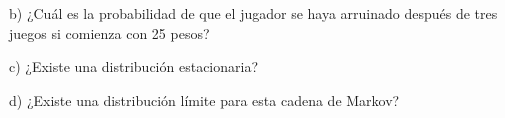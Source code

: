 \documentclass[a4paper, 12pt]{article}
\newcommand{\Aspace}{0.2cm}
\begin{document}
\begin{enumerate}
            \vspace{\Aspace} \par
            b) ¿Cuál es la probabilidad de que el jugador se haya arruinado después de tres juegos si comienza con 25 pesos?
            \\ { \color{azul}  }

            \vspace{\Aspace} \par
            c) ¿Existe una distribución estacionaria?
            \\ { \color{azul}  }

            \vspace{\Aspace} \par
            d) ¿Existe una distribución límite para esta cadena de Markov?
            \\ { \color{azul}  }
    \end{enumerate}
\end{document}

